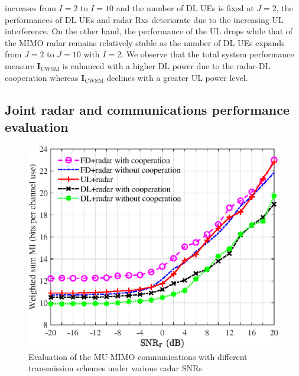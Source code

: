 \documentclass[9pt,journal]{IEEEtran}
\begin{document}
increases from $\mathit{I}=2$ to $\mathit{I}=10$ and the number of DL UEs is fixed at $\mathit{J}=2$, the performances of DL UEs and radar Rxs deteriorate due to the increasing UL interference. On the other hand, the performance of the UL drops while that of the MIMO radar remains relatively stable as the number of DL UEs expands from $\mathit{J}=2$ to $\mathit{J}=10$ with $\mathit{I}=2$. We observe that the total system performance measure  $\mathbf{I}_{\textrm{CWSM}}$ is enhanced with a higher DL power due to the radar-DL cooperation whereas $\mathbf{I}_{\textrm{CWSM}}$ declines with a greater UL power level. 

\vspace{-1em}
\subsection{Joint radar and communications performance evaluation}
\begin{figure}[t]
	\centering
	\includegraphics[width=1\columnwidth]{fd_vs_hd.eps}
	\caption{Evaluation of the MU-MIMO communications with different transmission schemes under various radar SNRs}
	\label{fig:fd_vs_hd}
	\vspace{-1em}
\end{figure}
\end{document}
